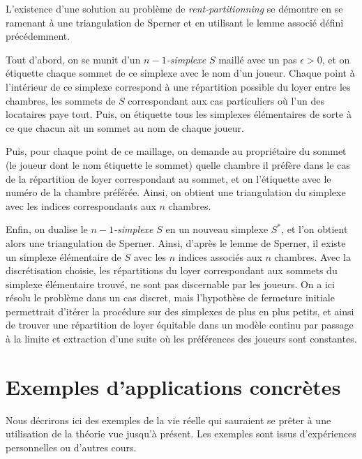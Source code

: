 \documentclass[12pt,twoside,a4paper]{article}
\begin{document}
L'existence d'une solution au probl\`eme de \textit{rent-partitionning} se d\'emontre en se ramenant \`a une triangulation de Sperner et en utilisant le lemme associ\'e d\'efini pr\'ec\'edemment.

Tout d'abord, on se munit d'un \textit{$n-1$-simplexe} $S$ maill\'e avec un pas $\epsilon>0$, et on \'etiquette chaque sommet de ce simplexe avec le nom d'un joueur. Chaque point \`a l'int\'erieur de ce simplexe correspond \`a une r\'epartition possible du loyer entre les chambres, les sommets de $S$ correspondant aux cas particuliers o\`u l'un des locataires paye tout. Puis, on \'etiquette tous les simplexes \'el\'ementaires de sorte \`a ce que chacun ait un sommet au nom de chaque joueur.

Puis, pour chaque point de ce maillage, on demande au propri\'etaire du sommet (le joueur dont le nom \'etiquette le sommet) quelle chambre il pr\'ef\`ere dans le cas de la r\'epartition de loyer correspondant au sommet, et on l'\'etiquette avec le num\'ero de la chambre pr\'ef\'er\'ee. Ainsi, on obtient une triangulation du simplexe avec les indices correspondants aux $n$ chambres.

Enfin, on dualise le \textit{$n-1$-simplexe} $S$ en un nouveau simplexe $S^*$, et l'on obtient alors une triangulation de Sperner. Ainsi, d'apr\`es le lemme de Sperner, il existe un simplexe \'el\'ementaire de $S$ avec les $n$ indices associ\'es aux $n$ chambres. Avec la discr\'etisation choisie, les r\'epartitions du loyer correspondant aux sommets du simplexe \'el\'ementaire trouv\'e, ne sont pas discernable par les joueurs. On a ici r\'esolu le probl\`eme dans un cas discret, mais l'hypoth\`ese de fermeture initiale permettrait d'it\'erer la proc\'edure sur des simplexes de plus en plus petits, et ainsi de trouver une r\'epartition de loyer \'equitable dans un mod\`ele continu par passage \`a la limite et extraction d'une suite o\`u les pr\'ef\'erences des joueurs sont constantes.


\section{Exemples d'applications concr\`etes}

Nous décrirons ici des exemples de la vie r\'eelle qui sauraient se pr\^{e}ter \`a une utilisation de la th\'eorie vue jusqu'\`a présent. Les exemples sont issus d'expériences personnelles ou d'autres cours.
\end{document}
